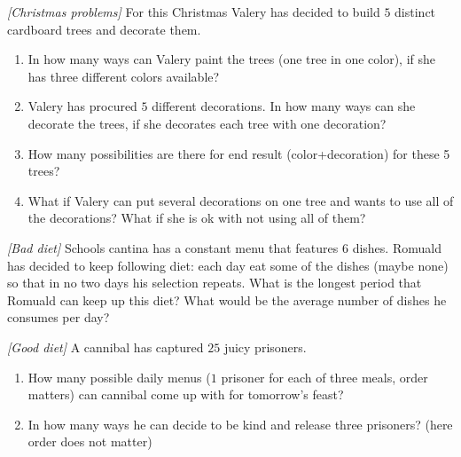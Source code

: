 

%

\renewcommand{\theenumi}{\alph{enumi}}



\noindent 

\begin{problem}
\textit{[Christmas problems]}
For this Christmas Valery has decided to build $5$ distinct cardboard trees and decorate them.
\begin{enumerate}
\item In how many ways can Valery paint the trees (one tree in one color), if she has three different colors available?
\item Valery has procured $5$ different decorations. In how many ways can she decorate the trees, if she decorates each tree with one decoration?
\item How many possibilities are there for end result (color+decoration) for these 5 trees?
\item What if Valery can put several decorations on one tree and wants to use all of the decorations? What if she is ok with not using all of them?
\end{enumerate}
\end{problem}
%

\begin{problem}
\textit{[Bad diet]}
Schools cantina has a constant menu that features $6$ dishes. Romuald has decided to keep following diet: each day eat some of the dishes (maybe none) so that in no two days his selection repeats.
What is the longest period that Romuald can keep up this diet? What would be the average number of dishes he consumes per day?
\end{problem}
%

\begin{problem}
\textit{[Good diet]}
A cannibal has captured $25$ juicy prisoners.
\begin{enumerate}
\item How many possible daily menus ($1$ prisoner for each of three meals, order matters) can cannibal come up with for tomorrow's feast?
\item In how many ways he can decide to be kind and release three prisoners? (here order does not matter)
\end{enumerate}
\end{problem}
%


